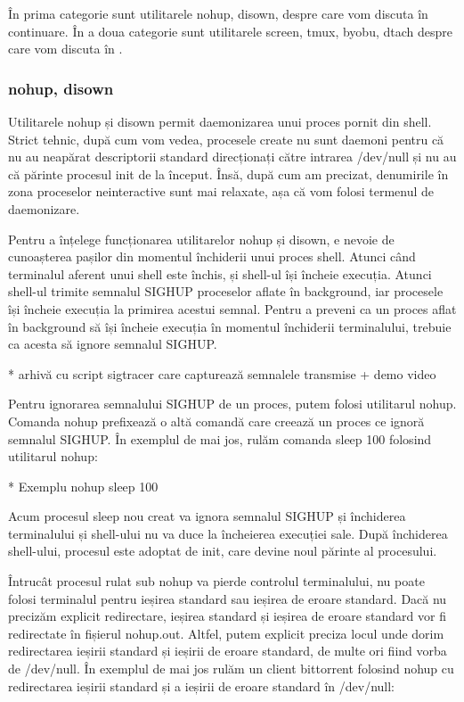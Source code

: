În prima categorie sunt utilitarele nohup, disown, despre care vom discuta în
continuare. În a doua categorie sunt utilitarele screen, tmux, byobu, dtach
despre care vom discuta în
.

\subsubsection{nohup, disown}
\label{sec:procese-interactivitate-detasare-nohup}

Utilitarele nohup și disown permit daemonizarea unui proces pornit din shell.
Strict tehnic, după cum vom vedea, procesele create nu sunt daemoni pentru că nu
au neapărat descriptorii standard direcționați către intrarea /dev/null și nu au
că părinte procesul init de la început. Însă, după cum am precizat, denumirile
în zona proceselor neinteractive sunt mai relaxate, așa că vom folosi termenul
de daemonizare.

Pentru a înțelege funcționarea utilitarelor nohup și disown, e nevoie de
cunoașterea pașilor din momentul închiderii unui proces shell. Atunci când
terminalul aferent unui shell este închis, și shell-ul își încheie execuția.
Atunci shell-ul trimite semnalul SIGHUP proceselor aflate în background, iar
procesele își încheie execuția la primirea acestui semnal. Pentru a preveni ca
un proces aflat în background să își încheie execuția în momentul închiderii
terminalului, trebuie ca acesta să ignore semnalul SIGHUP.

* arhivă cu script sigtracer care capturează semnalele transmise + demo video

Pentru ignorarea semnalului SIGHUP de un proces, putem folosi utilitarul nohup.
Comanda nohup prefixează o altă comandă care creează un proces ce ignoră
semnalul SIGHUP. În exemplul de mai jos, rulăm comanda sleep 100 folosind
utilitarul nohup:

* Exemplu nohup sleep 100

Acum procesul sleep nou creat va ignora semnalul SIGHUP și închiderea
terminalului și shell-ului nu va duce la încheierea execuției sale. După
închiderea shell-ului, procesul este adoptat de init, care devine noul părinte
al procesului.

Întrucât procesul rulat sub nohup va pierde controlul terminalului, nu poate
folosi terminalul pentru ieșirea standard sau ieșirea de eroare standard. Dacă
nu precizăm explicit redirectare, ieșirea standard și ieșirea de eroare standard
vor fi redirectate în fișierul nohup.out. Altfel, putem explicit preciza locul
unde dorim redirectarea ieșirii standard și ieșirii de eroare standard, de multe
ori fiind vorba de /dev/null. În exemplul de mai jos rulăm un client bittorrent
folosind nohup cu redirectarea ieșirii standard și a ieșirii de eroare standard
în /dev/null:

